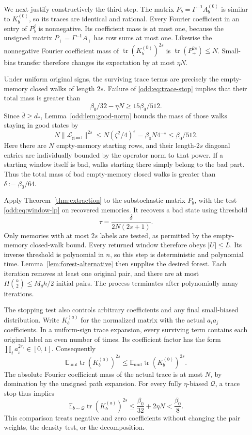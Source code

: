 \documentclass[letterpaper,11pt]{article}
\theoremstyle{definition}
\newcommand{\E}{\mathbb E}
\begin{document}
We next justify constructively the third step.  The matrix
$P_b=\Gamma^{-1}A_b^{(0)}$ is similar to $K_b^{(0)}$, so its traces are
identical and rational.  Every Fourier coefficient in an entry of
$P_b^j$ is nonnegative.  Its coefficient mass is at most one, because
the unsigned matrix $P_+=\Gamma^{-1}A_+$ has row sums at most one.
Likewise the nonnegative Fourier coefficient mass of
$\operatorname{tr}(K_b^{(0)})^{2s}$ is
$\operatorname{tr}(P_+^{2s})\leq N$.  Small-bias transfer therefore changes
its expectation by at most $\eta N$.

Under uniform original signs, the surviving trace terms are precisely
the empty-memory closed walks of length $2s$.  Failure of
\eqref{odd:eq:trace-stop} implies that their total mass is greater than
\[
 \beta_0/32-\eta N\geq15\beta_0/512.
\]
Since $\overline d\geq d_*$, Lemma~\ref{odd:lem:good-norm} bounds the
mass of those walks staying in good states by
\[
 N\|\mathcal L_{\mathrm{good}}\|^{2s}
 \leq N(\zeta^2/4)^s
 =\beta_0 N4^{-s}\leq\beta_0/512.
\]
Here there are $N$ empty-memory starting rows, and their length-$2s$
diagonal entries are individually bounded by the operator norm to that
power.  If a starting window itself is bad, walks starting there simply
belong to the bad part.  Thus the total mass of bad empty-memory closed
walks is greater than $\delta:=\beta_0/64$.

Apply Theorem~\ref{thm:extraction} to the substochastic matrix $P_b$,
with the test \eqref{odd:eq:window-lp} on recovered memories.  It recovers
a bad state using threshold
\begin{equation}\label{odd:eq:extraction-threshold}
 \tau=\frac{\delta}{2N(2s+1)}.
\end{equation}
Only memories with at most $2s$ labels are tested, as permitted by the
empty-memory closed-walk bound.  Every returned window therefore obeys
$|U|\leq L$.  Its inverse threshold is polynomial in $n$, so this step
is deterministic and polynomial time.  Lemma~\ref{lem:forest-alternative}
then supplies the desired forest.  Each iteration removes at least one
original pair, and there are at most $H\binom h2\leq M_qh/2$ initial
pairs.  The process terminates after polynomially many iterations.

The stopping test also controls arbitrary coefficients and any final
small-biased distribution.  Write $K_b^{(a)}$ for the normalized matrix
with the actual $a_i a_j$ coefficients.  In a uniform-sign trace
expansion, every surviving term contains each original label an even
number of times.  Its coefficient factor has the form
$\prod_i a_i^{2r_i}\in[0,1]$.  Consequently
\[
 \E_{\mathrm{unif}}\operatorname{tr}(K_b^{(a)})^{2s}
 \leq\E_{\mathrm{unif}}\operatorname{tr}(K_b^{(0)})^{2s}.
\]
The absolute Fourier coefficient mass of the actual trace is at most
$N$, by domination by the unsigned path expansion.  For every fully
$\eta$-biased $\mathcal Q$, a trace stop thus implies
\begin{equation}\label{odd:eq:actual-trace}
 \E_{b\sim\mathcal Q}\operatorname{tr}(K_b^{(a)})^{2s}
 \leq\frac{\beta_0}{32}+2\eta N<\frac{\beta_0}{8}.
\end{equation}
This comparison treats negative and zero coefficients without changing
the pair weights, the density test, or the decomposition.
\end{document}
